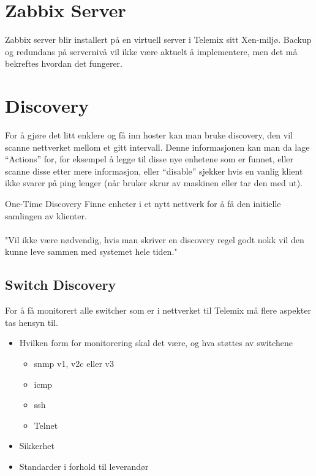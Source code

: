 \section{Zabbix Server}

Zabbix server blir installert på en virtuell server i Telemix sitt Xen-miljø. Backup og redundans på servernivå vil ikke være aktuelt å implementere, men det må bekreftes hvordan det fungerer.


\section{Discovery}
For å gjøre det litt enklere og få inn hoster kan man bruke discovery, den vil scanne nettverket mellom et gitt intervall. Denne informasjonen kan man da lage “Actions” for, for eksempel å legge til disse nye enhetene som er funnet, eller scanne disse etter mere informasjon, eller “disable” sjekker hvis en vanlig klient ikke svarer på ping lenger (når bruker skrur av maskinen eller tar den med ut).

\begin{tanke}{One-Time Discovery}
Finne enheter i et nytt nettverk for å få den initielle samlingen av klienter.
\\
\\
"Vil ikke være nødvendig, hvis man skriver en discovery regel godt nokk vil den kunne leve sammen med systemet hele tiden."
\end{tanke}

\subsection{Switch Discovery}
For å få monitorert alle switcher som er i nettverket til Telemix må flere aspekter tas hensyn til. 
\begin{itemize}
    \item Hvilken form for monitorering skal det være, og hva støttes av switchene 
        \begin{itemize}
            \item \gls{snmp} v1, v2c eller v3
            \item \gls{icmp}
            \item \gls{ssh}
            \item Telnet
        \end{itemize}
    \item Sikkerhet
    \item Standarder i forhold til leverandør
\end{itemize}

